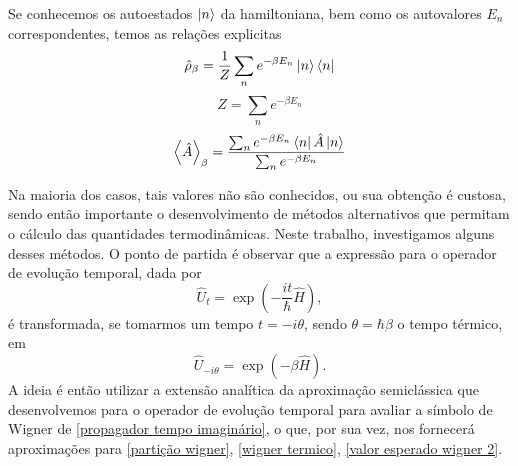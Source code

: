 \documentclass[
	12pt,
	oneside,			%
	a4paper,			%
	english,			%
	brazil				%
	]{abntex2}
\theoremstyle{definition}
\begin{document}
Se conhecemos os autoestados $\ket{n}$ da hamiltoniana, bem como os autovalores $E_n$ correspondentes, temos as relações explicitas
\begin{equation}
    \hat{\rho}_\beta = \frac{1}{Z}\sum_{n}e^{-\beta E_n} \ket{n} \bra{n}
\end{equation}
\begin{equation}
\label{partição exata}
    Z = \sum_n e^{-\beta E_n}
\end{equation}
\begin{equation}
\label{valor esperado exato}
    \ev{\hat{A}}_\beta = \dfrac{ \sum_n e^{-\beta E_n}\bra{n}\hat{A}\ket{n} }{\sum_n e^{-\beta E_n} }
\end{equation}

Na maioria dos casos, tais valores não são conhecidos, ou sua obtenção é custosa, sendo então importante o desenvolvimento de métodos alternativos que permitam o cálculo das quantidades termodinâmicas. Neste trabalho, investigamos alguns desses métodos. O ponto de partida é observar que a expressão para o operador de evolução temporal, dada por 
\begin{equation}
    \hat{U}_t = \exp\left( - \frac{it}{\hbar} \hat{H} \right),
\end{equation}
é transformada, se tomarmos um tempo $t = -i\theta$, sendo $\theta = \hbar \beta$ o tempo térmico, em
\begin{equation}
\label{propagador tempo imaginário}
    \hat{U}_{-i\theta} = \exp \left( -\beta \hat{H} \right).
\end{equation}
A ideia é então utilizar a extensão analítica da aproximação semiclássica que desenvolvemos para o operador de evolução temporal para avaliar a símbolo de Wigner de \eqref{propagador tempo imaginário}, o que, por sua vez, nos fornecerá aproximações para \eqref{partição wigner}, \eqref{wigner termico}, \eqref{valor esperado wigner 2}.
\end{document}
